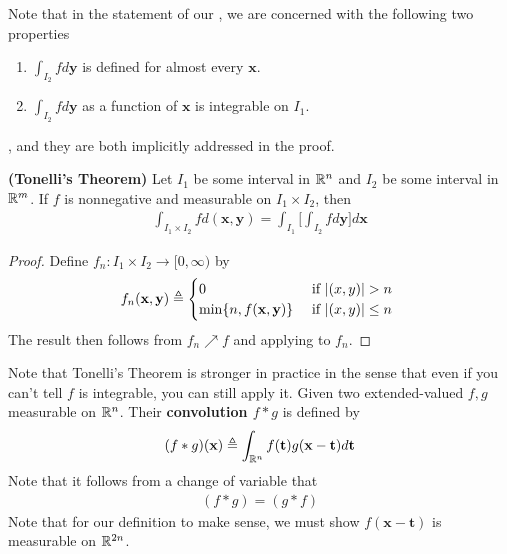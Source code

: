 \documentclass{report}
\begin{document}
\begin{mdframed}
Note that in the statement of our , we are concerned with the following two properties 
\begin{enumerate}[label=(\alph*)]
  \item $\int_{I_2}fd\textbf{y}$ is defined for almost every $\textbf{x}$. 
  \item $\int_{I_2}fd\textbf{y}$ as a function of $\textbf{x}$ is integrable on $I_1$. 
\end{enumerate}
, and they are both implicitly addressed in the proof.  
\end{mdframed}
\begin{theorem}
\label{TnT}
\textbf{(Tonelli's Theorem)} Let $I_1$ be some interval in  $\mathbb{R}^n$ and  $I_2$ be some interval in $\mathbb{R}^m$. If  $f$ is nonnegative and measurable on $I_1 \times I_2$, then 
\begin{align*}
\int_{I_1\times I_2}fd(\textbf{x},\textbf{y})=\int_{I_1} \Big[\int_{I_2}fd\textbf{y} \Big]d\textbf{x}
\end{align*}
\end{theorem}
\begin{proof}
Define $f_n:I_1 \times I_2\rightarrow [0,\infty )$ by 
\begin{align*}
f_n(\textbf{x},\textbf{y})\triangleq \begin{cases}
  0& \text{ if $\abso{(x,y)}>n$ }\\
  \min \set{n, f(\textbf{x},\textbf{y})}& \text{ if $\abso{(x,y)}\leq n$ }
\end{cases}
\end{align*}
The result then follows from $f_n\nearrow f$ and applying  to  $f_n$. 
\end{proof}
\begin{mdframed}
Note that Tonelli's Theorem is stronger in practice in the sense that even if you can't tell $f$ is integrable, you can still apply it. Given two extended-valued $f,g$ measurable on $\mathbb{R}^n$. Their  \textbf{convolution $f*g$} is defined by
\begin{align*}
  (f*g)(\textbf{x})\triangleq \int_{\mathbb{R}^n}f(\textbf{t})g(\textbf{x}-\textbf{t})d\textbf{t}
\end{align*}
Note that it follows from a change of variable that 
\begin{align*}
  (f*g)=(g*f)
\end{align*}
Note that for our definition to make sense, we must show $f(\textbf{x}-\textbf{t})$ is measurable on $\mathbb{R}^{2n}$. 
\end{mdframed}
\end{document}
